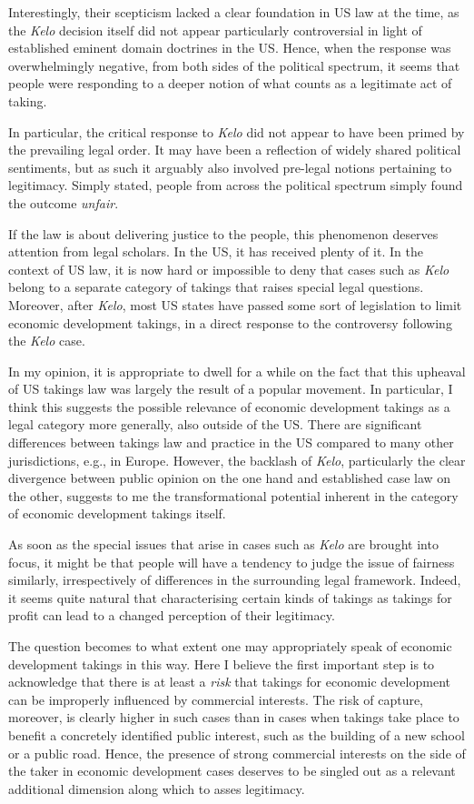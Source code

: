 Interestingly, their scepticism lacked a clear foundation in US law at the time, as the {\it Kelo} decision itself did not appear particularly controversial in light of established eminent domain doctrines in the US. Hence, when the response was overwhelmingly negative, from both sides of the political spectrum, it seems that people were responding to a deeper notion of what counts as a legitimate act of taking.

In particular, the critical response to {\it Kelo} did not appear to have been primed by the prevailing legal order. It may have been a reflection of widely shared political sentiments, but as such it arguably also involved pre-legal notions pertaining to legitimacy. Simply stated, people from across the political spectrum simply found the outcome {\it unfair}.

If the law is about delivering justice to the people, this phenomenon deserves attention from legal scholars. In the US, it has received plenty of it. In the context of US law, it is now hard or impossible to deny that cases such as {\it Kelo} belong to a separate category of takings that raises special legal questions. Moreover, after {\it Kelo}, most US states have passed some sort of legislation to limit economic development takings, in a direct response to the controversy following the {\it Kelo} case. 

In my opinion, it is appropriate to dwell for a while on the fact that this upheaval of US takings law was largely the result of a popular movement. In particular, I think this suggests the possible relevance of economic development takings as a legal category more generally, also outside of the US. There are significant differences between takings law and practice in the US compared to many other jurisdictions, e.g., in Europe. However, the backlash of {\it Kelo}, particularly the clear divergence between public opinion on the one hand and established case law on the other, suggests to me the transformational potential inherent in the category of economic development takings itself.

As soon as the special issues that arise in cases such as {\it Kelo} are brought into focus, it might be that people will have a tendency to judge the issue of fairness similarly, irrespectively of differences in the surrounding legal framework. Indeed, it seems quite natural that characterising certain kinds of takings as takings for profit can lead to a changed perception of their legitimacy.

The question becomes to what extent one may appropriately speak of economic development takings in this way. Here I believe the first important step is to acknowledge that there is at least a {\it risk} that takings for economic development can be improperly influenced by commercial interests. The risk of capture, moreover, is clearly higher in such cases than in cases when takings take place to benefit a concretely identified public interest, such as the building of a new school or a public road. Hence, the presence of strong commercial interests on the side of the taker in economic development cases deserves to be singled out as a relevant additional dimension along which to asses legitimacy.

